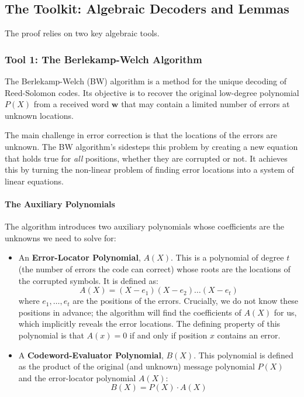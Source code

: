 \documentclass{article}
\begin{document}
\subsection{The Toolkit: Algebraic Decoders and Lemmas}
The proof relies on two key algebraic tools.



\subsubsection{Tool 1: The Berlekamp-Welch Algorithm}
The Berlekamp-Welch (BW) algorithm is a method for the unique decoding of Reed-Solomon codes. Its objective is to recover the original low-degree polynomial $P(X)$ from a received word $\mathbf{w}$ that may contain a limited number of errors at unknown locations.

The main challenge in error correction is that the locations of the errors are unknown. The BW algorithm's sidesteps this problem by creating a new equation that holds true for \textit{all} positions, whether they are corrupted or not. It achieves this by turning the non-linear problem of finding error locations into a system of linear equations.

\paragraph{The Auxiliary Polynomials}
The algorithm introduces two auxiliary polynomials whose coefficients are the unknowns we need to solve for:
\begin{itemize}
    \item An \textbf{Error-Locator Polynomial}, $A(X)$. This is a polynomial of degree $t$ (the number of errors the code can correct) whose roots are the locations of the corrupted symbols. It is defined as:
    \[ A(X) = (X - e_1)(X - e_2)\dots(X - e_t) \]
    where $e_1, \dots, e_t$ are the positions of the errors. Crucially, we do not know these positions in advance; the algorithm will find the coefficients of $A(X)$ for us, which implicitly reveals the error locations. The defining property of this polynomial is that $A(x) = 0$ if and only if position $x$ contains an error.

    \item A \textbf{Codeword-Evaluator Polynomial}, $B(X)$. This polynomial is defined as the product of the original (and unknown) message polynomial $P(X)$ and the error-locator polynomial $A(X)$:
    \[ B(X) = P(X) \cdot A(X) \]
\end{itemize}
\end{document}
